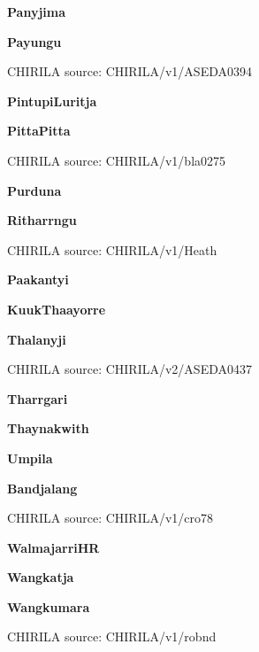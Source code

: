 \textbf{Panyjima}


\textbf{Payungu}

CHIRILA source: CHIRILA/v1/ASEDA0394


\textbf{PintupiLuritja}


\textbf{PittaPitta}

CHIRILA source: CHIRILA/v1/bla0275


\textbf{Purduna}


\textbf{Ritharrngu}

CHIRILA source: CHIRILA/v1/Heath


\textbf{Paakantyi}


\textbf{KuukThaayorre}


\textbf{Thalanyji}

CHIRILA source: CHIRILA/v2/ASEDA0437


\textbf{Tharrgari}


\textbf{Thaynakwith}


\textbf{Umpila}


\textbf{Bandjalang}

CHIRILA source: CHIRILA/v1/cro78


\textbf{WalmajarriHR}


\textbf{Wangkatja}


\textbf{Wangkumara}

CHIRILA source: CHIRILA/v1/robnd


